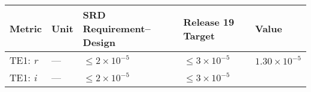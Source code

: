\documentclass[DM,lsstdraft,toc]{lsstdoc}
\begin{document}
\begin{longtable}[]{@{}lllll@{}}
\toprule
\begin{minipage}[b]{0.13\columnwidth}\raggedright\strut
Metric\strut
\end{minipage} & \begin{minipage}[b]{0.05\columnwidth}\raggedright\strut
Unit\strut
\end{minipage} & \begin{minipage}[b]{0.24\columnwidth}\raggedright\strut
SRD Requirement--Design\strut
\end{minipage} & \begin{minipage}[b]{0.21\columnwidth}\raggedright\strut
Release 19 Target\strut
\end{minipage} & \begin{minipage}[b]{0.22\columnwidth}\raggedright\strut
Value\strut
\end{minipage}\tabularnewline
\midrule
\endhead
\begin{minipage}[t]{0.13\columnwidth}\raggedright\strut
TE1: \emph{r}\strut
\end{minipage} & \begin{minipage}[t]{0.05\columnwidth}\raggedright\strut
---\strut
\end{minipage} & \begin{minipage}[t]{0.24\columnwidth}\raggedright\strut
\(\leq 2\times 10^{-5}\)\strut
\end{minipage} & \begin{minipage}[t]{0.21\columnwidth}\raggedright\strut
\(\leq 3\times 10^{-5}\)\strut
\end{minipage} & \begin{minipage}[t]{0.22\columnwidth}\raggedright\strut
\(1.30\times 10^{-5}\)\strut
\end{minipage}\tabularnewline
\begin{minipage}[t]{0.13\columnwidth}\raggedright\strut
TE1: \emph{i}\strut
\end{minipage} & \begin{minipage}[t]{0.05\columnwidth}\raggedright\strut
---\strut
\end{minipage} & \begin{minipage}[t]{0.24\columnwidth}\raggedright\strut
\(\leq 2\times 10^{-5}\)\strut
\end{minipage} & \begin{minipage}[t]{0.21\columnwidth}\raggedright\strut
\(\leq 3\times 10^{-5}\)\strut
\end{minipage} & \begin{minipage}[t]{0.22\columnwidth}\raggedright\strut

\end{minipage}
\end{longtable}
\end{document}
